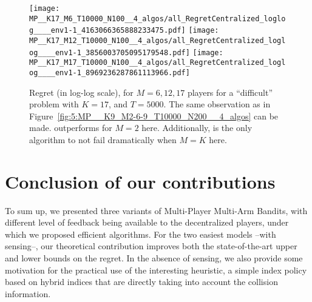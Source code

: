 \begin{figure}[!h]
  \centering
      \texttt{[image: MP\_\_K17\_M6\_T10000\_N100\_\_4\_algos/all\_RegretCentralized\_loglog\_\_\_\_env1-1\_4163066365888233475.pdf]}
      \texttt{[image: MP\_\_K17\_M12\_T10000\_N100\_\_4\_algos/all\_RegretCentralized\_loglog\_\_\_\_env1-1\_3856003705095179548.pdf]}
      \texttt{[image: MP\_\_K17\_M17\_T10000\_N100\_\_4\_algos/all\_RegretCentralized\_loglog\_\_\_\_env1-1\_8969236287861113966.pdf]}
  \caption[Regret for $M=6, 12, 17$ players for a ``difficult'' problem with $K=17$, and $T=5000$]{Regret (in log-log scale), for $M=6, 12, 17$ players for a ``difficult'' problem with $K=17$, and $T=5000$. The same observation as in Figure~\ref{fig:5:MP__K9_M2-6-9_T10000_N200__4_algos} can be made. \Selfish{} outperforms \MCTopM{} for $M=2$ here. Additionally, \MCTopM{} is the only algorithm to not fail dramatically when $M=K$ here.}
  \label{fig:5:MP__K17_M6-12-17_T10000_N100__4_algos}
\end{figure}



\section{Conclusion of our contributions}
\label{sec:5:conclusion}

To sum up, we presented three variants of Multi-Player Multi-Arm Bandits,
with different level of feedback being available to the decentralized players, under which we proposed efficient algorithms.
For the two easiest models --with sensing--, our theoretical contribution improves both the state-of-the-art upper and lower bounds on the regret. In the absence of sensing, we also provide some motivation for the practical use of the interesting \Selfish{} heuristic, a simple index policy based on hybrid indices that are directly taking  into account the collision information.

